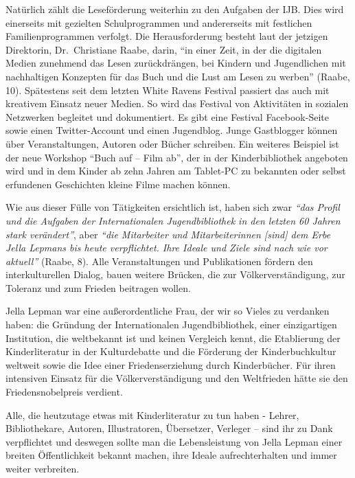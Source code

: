 \documentclass[a4paper,
fontsize=11pt,
oneside,
numbers=noperiodatend,
parskip=half-,
bibliography=totoc,
final
]{scrartcl}
\begin{document}
Natürlich zählt die Leseförderung weiterhin zu den Aufgaben der IJB.
Dies wird einerseits mit gezielten Schulprogrammen und andererseits mit
festlichen Familienprogrammen verfolgt. Die Herausforderung besteht laut
der jetzigen Direktorin, Dr.~Christiane Raabe, darin, \enquote{in einer
Zeit, in der die digitalen Medien zunehmend das Lesen zurückdrängen, bei
Kindern und Jugendlichen mit nachhaltigen Konzepten für das Buch und die
Lust am Lesen zu werben} (Raabe, 10). Spätestens seit dem letzten White
Ravens Festival passiert das auch mit kreativem Einsatz neuer Medien. So
wird das Festival von Aktivitäten in sozialen Netzwerken begleitet und
dokumentiert. Es gibt eine Festival Facebook-Seite sowie einen
Twitter-Account und einen Jugendblog. Junge Gastblogger können über
Veranstaltungen, Autoren oder Bücher schreiben. Ein weiteres Beispiel
ist der neue Workshop \enquote{Buch auf -- Film ab}, der in der
Kinderbibliothek angeboten wird und in dem Kinder ab zehn Jahren am
Tablet-PC zu bekannten oder selbst erfundenen Geschichten kleine Filme
machen können.

Wie aus dieser Fülle von Tätigkeiten ersichtlich ist, haben sich zwar
\emph{\enquote{das Profil und die Aufgaben der Internationalen
Jugendbibliothek in den letzten 60 Jahren stark verändert}}, aber
\emph{\enquote{die Mitarbeiter und Mitarbeiterinnen {[}sind{]} dem Erbe
Jella Lepmans bis heute verpflichtet. Ihre Ideale und Ziele sind nach
wie vor aktuell}} (Raabe, 8). Alle Veranstaltungen und Publikationen
fördern den interkulturellen Dialog, bauen weitere Brücken, die zur
Völkerverständigung, zur Toleranz und zum Frieden beitragen wollen.

Jella Lepman war eine außerordentliche Frau, der wir so Vieles zu
verdanken haben: die Gründung der Internationalen Jugendbibliothek,
einer einzigartigen Institution, die weltbekannt ist und keinen
Vergleich kennt, die Etablierung der Kinderliteratur in der
Kulturdebatte und die Förderung der Kinderbuchkultur weltweit sowie die
Idee einer Friedenserziehung durch Kinderbücher. Für ihren intensiven
Einsatz für die Völkerverständigung und den Weltfrieden hätte sie den
Friedensnobelpreis verdient.~

Alle, die heutzutage etwas mit Kinderliteratur zu tun haben - Lehrer,
Bibliothekare, Autoren, Illustratoren, Übersetzer, Verleger -- sind ihr
zu Dank verpflichtet und deswegen sollte man die Lebensleistung von
Jella Lepman einer breiten Öffentlichkeit bekannt machen, ihre Ideale
aufrechterhalten und immer weiter verbreiten.
\end{document}
